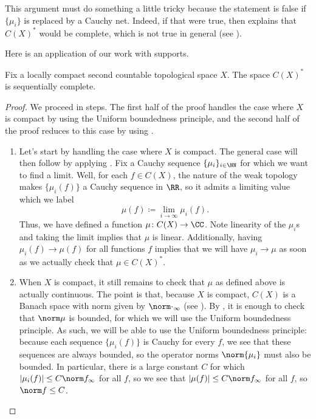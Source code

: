 \documentclass[../notes.tex]{subfiles}
\begin{document}
\begin{remark}
	This argument must do something a little tricky because the statement is false if $\{\mu_i\}$ is replaced by a Cauchy net. Indeed, if that were true, then  explains that $C(X)^*$ would be complete, which is not true in general (see ).
\end{remark}
Here is an application of our work with supports.
\begin{lemma}
	Fix a locally compact second countable topological space $X$. The space $C(X)^*$ is sequentially complete.
\end{lemma}
\begin{proof}
	We proceed in steps. The first half of the proof handles the case where $X$ is compact by using the Uniform boundedness principle, and the second half of the proof reduces to this case by using .
	\begin{enumerate}
		\item Let's start by handling the case where $X$ is compact. The general case will then follow by applying . Fix a Cauchy sequence $\{\mu_i\}_{i\in\NN}$ for which we want to find a limit. Well, for each $f\in C(X)$, the nature of the weak topology makes $\{\mu_i(f)\}$ a Cauchy sequence in $\RR$, so it admits a limiting value which we label
		\[\mu(f)\coloneqq\lim_{i\to\infty}\mu_i(f).\]
		Thus, we have defined a function $\mu\colon C(X)\to\CC$. Note linearity of the $\mu_i$s and taking the limit implies that $\mu$ is linear. Additionally, having $\mu_i(f)\to\mu(f)$ for all functions $f$ implies that we will have $\mu_i\to\mu$ as soon as we actually check that $\mu\in C(X)^*$.

		\item When $X$ is compact, it still remains to check that $\mu$ as defined above is actually continuous. The point is that, because $X$ is compact, $C(X)$ is a Banach space with norm given by $\norm\cdot_\infty$ (see ). By , it is enough to check that $\norm\mu$ is bounded, for which we will use the Uniform boundedness principle. As such, we will be able to use the Uniform boundedness principle: because each sequence $\{\mu_i(f)\}$ is Cauchy for every $f$, we see that these sequences are always bounded, so the operator norms $\norm{\mu_i}$ must also be bounded. In particular, there is a large constant $C$ for which $\left|\mu_i(f)\right|\le C\norm f_\infty$ for all $f$, so we see that $\left|\mu(f)\right|\le C\norm f_\infty$ for all $f$, so $\norm f\le C$.


\end{enumerate}
\end{proof}
\end{document}
